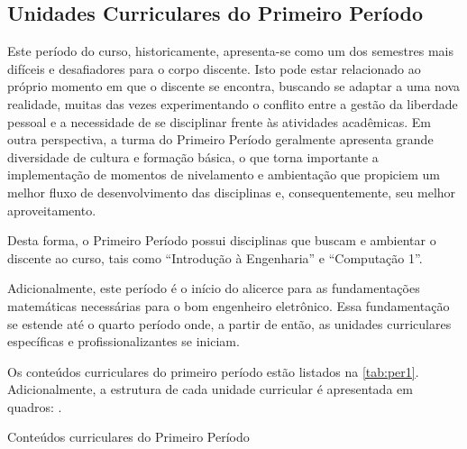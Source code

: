 \subsection{Unidades Curriculares do Primeiro Período}

Este período do curso, historicamente, apresenta-se como um dos semestres mais difíceis e desafiadores para o corpo discente. Isto pode estar relacionado ao próprio momento em que o discente se encontra, buscando se adaptar a uma nova realidade, muitas das vezes experimentando o conflito entre a gestão da liberdade pessoal e a necessidade de se disciplinar frente às atividades acadêmicas. Em outra perspectiva, a turma do Primeiro Período geralmente apresenta grande diversidade de cultura e formação básica, o que torna importante a implementação de momentos de nivelamento e ambientação que propiciem um melhor fluxo de desenvolvimento das disciplinas e, consequentemente, seu melhor aproveitamento.

Desta forma, o Primeiro Período possui disciplinas que buscam e ambientar o discente ao curso, tais como ``Introdução à Engenharia'' e ``Computação 1''.

Adicionalmente, este período é o início do alicerce para as fundamentações matemáticas necessárias para o bom engenheiro eletrônico. Essa fundamentação se estende até o quarto período onde, a partir de então, as unidades curriculares específicas e profissionalizantes se iniciam.


Os conteúdos curriculares do primeiro período estão listados na \autoref{tab:per1}. Adicionalmente, a estrutura de cada unidade curricular é apresentada em quadros: .

\begin{table}[!htb]
	\centering\footnotesize
	\caption{Conteúdos curriculares do Primeiro Período}
	\label{tab:per1}
\end{table}

\clearpage




